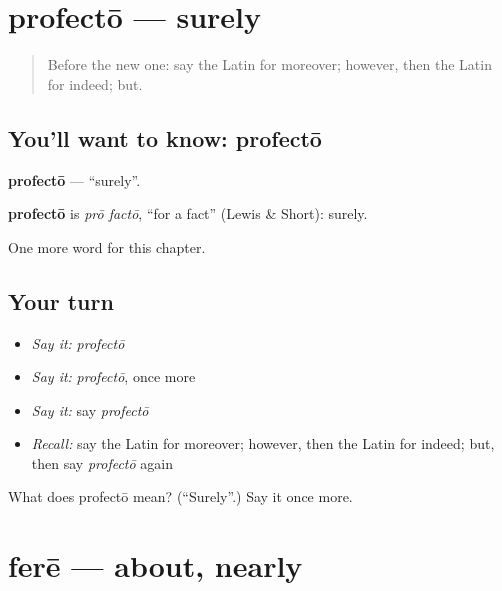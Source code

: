 \section[profectō]{profectō — surely}

\label{lesson:LA-C210-profecto}



\begin{quote}
Before the new one: say the Latin for moreover; however, then the Latin for indeed; but.
\end{quote}

\subsection*{You'll want to know: profectō}
\textbf{profectō} — \textquotedblleft{}surely\textquotedblright{}.

\begin{cousinweb}
\textbf{profectō} is \emph{prō factō}, \textquotedblleft{}for a fact\textquotedblright{} (Lewis \& Short): surely.
\end{cousinweb}

\begin{grammarlens}[title={What you've built}]
One more word for this chapter.
\end{grammarlens}

\subsection*{Your turn}
\begin{itemize}
\raggedright
  \item \emph{Say it:} \emph{profectō}
  \item \emph{Say it:} \emph{profectō}, once more
  \item \emph{Say it:} say \emph{profectō}
  \item \emph{Recall:} say the Latin for moreover; however, then the Latin for indeed; but, then say \emph{profectō} again
\end{itemize}

\begin{tcolorbox}[breakable,colback=teal!4,colframe=teal!35!black,title={Before you move on}]
What does profectō mean? (\textquotedblleft{}Surely\textquotedblright{}.) Say it once more.
\end{tcolorbox}
\section[ferē]{ferē — about, nearly}

